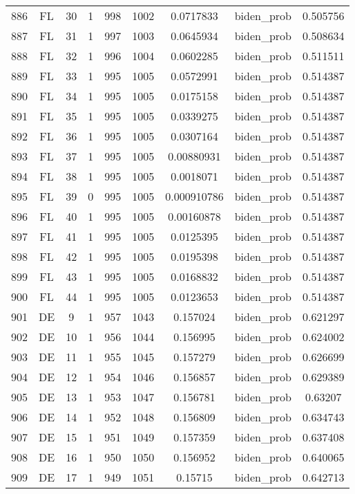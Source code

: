 \documentclass[12pt,a4paper]{article}
\begin{document}
\begin{tabular}{r|cccccccc}
	886 & FL & 30 & 1 & 998 & 1002 & 0.0717833 & biden\_prob & 0.505756 \\
	887 & FL & 31 & 1 & 997 & 1003 & 0.0645934 & biden\_prob & 0.508634 \\
	888 & FL & 32 & 1 & 996 & 1004 & 0.0602285 & biden\_prob & 0.511511 \\
	889 & FL & 33 & 1 & 995 & 1005 & 0.0572991 & biden\_prob & 0.514387 \\
	890 & FL & 34 & 1 & 995 & 1005 & 0.0175158 & biden\_prob & 0.514387 \\
	891 & FL & 35 & 1 & 995 & 1005 & 0.0339275 & biden\_prob & 0.514387 \\
	892 & FL & 36 & 1 & 995 & 1005 & 0.0307164 & biden\_prob & 0.514387 \\
	893 & FL & 37 & 1 & 995 & 1005 & 0.00880931 & biden\_prob & 0.514387 \\
	894 & FL & 38 & 1 & 995 & 1005 & 0.0018071 & biden\_prob & 0.514387 \\
	895 & FL & 39 & 0 & 995 & 1005 & 0.000910786 & biden\_prob & 0.514387 \\
	896 & FL & 40 & 1 & 995 & 1005 & 0.00160878 & biden\_prob & 0.514387 \\
	897 & FL & 41 & 1 & 995 & 1005 & 0.0125395 & biden\_prob & 0.514387 \\
	898 & FL & 42 & 1 & 995 & 1005 & 0.0195398 & biden\_prob & 0.514387 \\
	899 & FL & 43 & 1 & 995 & 1005 & 0.0168832 & biden\_prob & 0.514387 \\
	900 & FL & 44 & 1 & 995 & 1005 & 0.0123653 & biden\_prob & 0.514387 \\
	901 & DE & 9 & 1 & 957 & 1043 & 0.157024 & biden\_prob & 0.621297 \\
	902 & DE & 10 & 1 & 956 & 1044 & 0.156995 & biden\_prob & 0.624002 \\
	903 & DE & 11 & 1 & 955 & 1045 & 0.157279 & biden\_prob & 0.626699 \\
	904 & DE & 12 & 1 & 954 & 1046 & 0.156857 & biden\_prob & 0.629389 \\
	905 & DE & 13 & 1 & 953 & 1047 & 0.156781 & biden\_prob & 0.63207 \\
	906 & DE & 14 & 1 & 952 & 1048 & 0.156809 & biden\_prob & 0.634743 \\
	907 & DE & 15 & 1 & 951 & 1049 & 0.157359 & biden\_prob & 0.637408 \\
	908 & DE & 16 & 1 & 950 & 1050 & 0.156952 & biden\_prob & 0.640065 \\
	909 & DE & 17 & 1 & 949 & 1051 & 0.15715 & biden\_prob & 0.642713 \\

\end{tabular}
\end{document}
